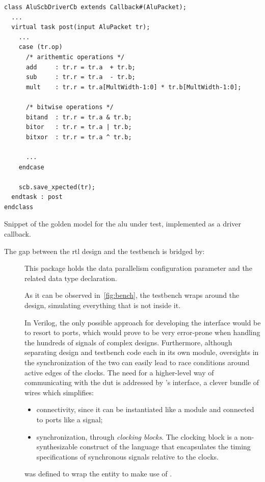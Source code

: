 \begin{listing}
\begin{verbatim}
class AluScbDriverCb extends Callback#(AluPacket);
  ...
  virtual task post(input AluPacket tr);
    ...
    case (tr.op)
      /* arithemtic operations */
      add     : tr.r = tr.a  + tr.b;
      sub     : tr.r = tr.a  - tr.b;
      mult    : tr.r = tr.a[MultWidth-1:0] * tr.b[MultWidth-1:0];

      /* bitwise operations */
      bitand  : tr.r = tr.a & tr.b;
      bitor   : tr.r = tr.a | tr.b;
      bitxor  : tr.r = tr.a ^ tr.b;

      ...
    endcase

    scb.save_xpected(tr);
  endtask : post
endclass
\end{verbatim}
\caption{Snippet of the golden model for the \ac{alu} under test, implemented as a driver callback.}
\label{list:alu_golden}
\end{listing}

\noindent The gap between the \ac{rtl} design and the \sv testbench is bridged by:
\begin{description}
    \item[] This package holds the data parallelism configuration parameter and the related data type declaration.
    
    \item[] As it can be observed in~\cref{fig:bench}, the testbench wraps around the design, simulating everything that is not inside it. 
    
    In Verilog, the only possible approach for developing the interface would be to resort to ports, which would prove to be very error-prone when handling the hundreds of signals of complex designs. Furthermore, although separating design and testbench code each in its own module, oversights in the synchronization of the two can easily lead to race conditions around active edges of the clocks.
    The need for a higher-level way of communicating with the \ac{dut} is addressed by \sv's interface, a clever bundle of wires which simplifies: 
    \begin{itemize}
        \item connectivity, since it can be instantiated like a module and connected to ports like a signal;
        \item synchronization, through \emph{clocking blocks}. The clocking block is a non-synthesizable construct of the language that encapsulates the timing specifications of synchronous signals relative to the clocks.
    \end{itemize}

     was defined to wrap the \vhdl entity to make use of .
\end{description}


